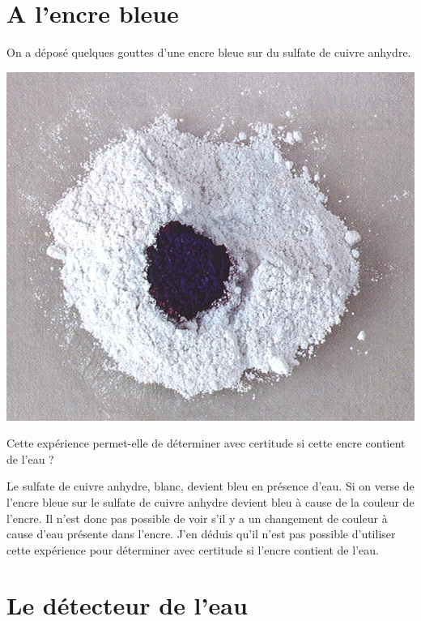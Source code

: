 \documentclass[a4paper,11pt]{exam}
\begin{document}

\section{A l'encre bleue}

On a déposé quelques gouttes d'une encre bleue sur du sulfate de cuivre anhydre.

\begin{center}
	\includegraphics[scale=0.7]{encre}
\end{center}

\begin{questions}
	\question Cette expérience permet-elle de déterminer avec certitude si cette encre contient de l'eau ?
	\begin{solution}
		Le sulfate de cuivre anhydre, blanc, devient bleu en présence d'eau. Si on verse de l'encre bleue sur le sulfate de cuivre anhydre devient bleu à cause de la couleur de l'encre. Il n'est donc pas possible de voir s'il y a un changement de couleur à cause d'eau présente dans l'encre. J'en déduis qu'il n'est pas possible d'utiliser cette expérience pour déterminer avec certitude si l'encre contient de l'eau.
	\end{solution}
\end{questions}


\section{Le détecteur de l'eau}
\end{document}
